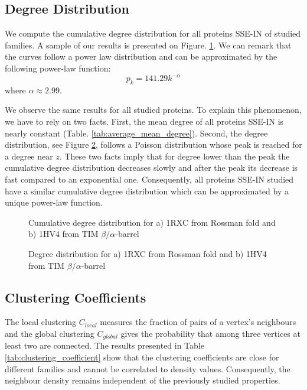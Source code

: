 \subsection {Degree Distribution}
We compute the cumulative degree distribution for all proteins SSE-IN of studied families. A sample of our results is presented on Figure. \ref{fig:cumulative_degree_distribution}. We can remark that the curves follow a power law distribution and can be approximated by the following power-law function:
\[ p_k = 141.29k^{-\alpha} \] 
where $\alpha \approx 2.99$.

We observe the same results for all studied proteins. To explain this phenomenon, we have to rely on two facts. First, the mean degree of all proteins SSE-IN is nearly constant (Table. \ref{tab:average_mean_degree}). Second, the degree distribution, see Figure \ref{fig:degree_distribution1}, follows a Poisson distribution whose peak is reached for a degree near $z$. These two facts imply that for degree lower than the peak the cumulative degree distribution decreases slowly and after the peak its decrease is fast compared to an exponential one. Consequently, all proteins SSE-IN studied have a similar cumulative degree distribution which can be approximated by a unique power-law function.
\begin{figure}
\centering
{}
\caption {Cumulative degree distribution for a) 1RXC from Rossman fold and b) 1HV4 from TIM $\beta / \alpha$-barrel}
\label {fig:cumulative_degree_distribution}
\end{figure}
\begin{figure}
\centering
{}
\caption {Degree distribution for a) 1RXC from Rossman fold and b) 1HV4 from TIM $\beta / \alpha$-barrel}
\label {fig:degree_distribution1}
\end{figure}
\subsection {Clustering Coefficients}
The local clustering $C_{local}$ measures the fraction of pairs of a vertex's neighbours and the global clustering $C_{global}$ gives the probability that among three vertices at least two are connected. The results presented in Table \ref{tab:clustering_coefficient} show that the clustering coefficients are close for different families and cannot be correlated to density values. Consequently, the neighbour density remains independent of the previously studied properties.

